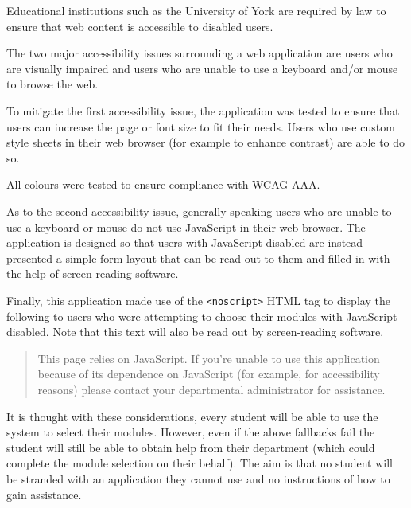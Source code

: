 \documentclass[draft]{scrartcl}
\begin{document}
Educational institutions such as the University of York are required by law to
ensure that web content is accessible to disabled users.


The two major accessibility issues surrounding a web application are users who
are visually impaired and users who are unable to use a keyboard and/or mouse
to browse the web.

To mitigate the first accessibility issue, the application was tested to
ensure that users can increase the page or font size to fit their needs. Users
who use custom style sheets in their web browser (for example to enhance
contrast) are able to do so.

All colours were tested to ensure compliance with WCAG AAA.


As to the second accessibility issue, generally speaking users who are unable
to use a keyboard or mouse do not use JavaScript in their web browser. The
application is designed so that users with JavaScript disabled are instead
presented a simple form layout that can be read out to them and filled in with
the help of screen-reading software.

Finally, this application made use of the \texttt{<noscript>} HTML tag to
display the following to users who were attempting to choose their modules
with JavaScript disabled. Note that this text will also be read out by
screen-reading software.

\begin{quote}
  This page relies on JavaScript. If you're unable to use this application
  because of its dependence on JavaScript (for example, for accessibility
  reasons) please contact your departmental administrator for assistance.
\end{quote}

It is thought with these considerations, every student will be able to use the
system to select their modules. However, even if the above fallbacks fail the
student will still be able to obtain help from their department (which could
complete the module selection on their behalf). The aim is that no student
will be stranded with an application they cannot use and no instructions of
how to gain assistance.

\end{document}
